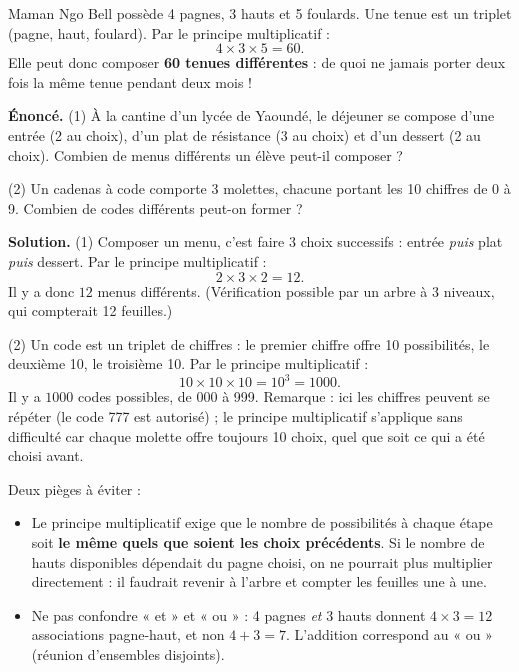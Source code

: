 \documentclass[11pt]{article}
\begin{document}
\begin{exemplebox}
Maman Ngo Bell possède 4 pagnes, 3 hauts et 5 foulards. Une tenue est un triplet (pagne, haut, foulard). Par le principe multiplicatif :
\[ 4\times 3\times 5=60. \]
Elle peut donc composer \textbf{60 tenues différentes} : de quoi ne jamais porter deux fois la même tenue pendant deux mois !
\end{exemplebox}

\begin{exoresolu}
\textbf{Énoncé.} (1) À la cantine d'un lycée de Yaoundé, le déjeuner se compose d'une entrée (2 au choix), d'un plat de résistance (3 au choix) et d'un dessert (2 au choix). Combien de menus différents un élève peut-il composer ?

(2) Un cadenas à code comporte 3 molettes, chacune portant les 10 chiffres de 0 à 9. Combien de codes différents peut-on former ?

\tcblower
\textbf{Solution.} (1) Composer un menu, c'est faire 3 choix successifs : entrée \emph{puis} plat \emph{puis} dessert. Par le principe multiplicatif :
\[ 2\times 3\times 2=12. \]
Il y a donc $\boxed{12}$ menus différents. (Vérification possible par un arbre à 3 niveaux, qui compterait 12 feuilles.)

(2) Un code est un triplet de chiffres : le premier chiffre offre 10 possibilités, le deuxième 10, le troisième 10. Par le principe multiplicatif :
\[ 10\times 10\times 10=10^3=1000. \]
Il y a $\boxed{1000}$ codes possibles, de 000 à 999. Remarque : ici les chiffres peuvent se répéter (le code 777 est autorisé) ; le principe multiplicatif s'applique sans difficulté car chaque molette offre toujours 10 choix, quel que soit ce qui a été choisi avant.
\end{exoresolu}

\begin{attention}
Deux pièges à éviter :
\begin{itemize}
\item Le principe multiplicatif exige que le nombre de possibilités à chaque étape soit \textbf{le même quels que soient les choix précédents}. Si le nombre de hauts disponibles dépendait du pagne choisi, on ne pourrait plus multiplier directement : il faudrait revenir à l'arbre et compter les feuilles une à une.
\item Ne pas confondre « et » et « ou » : 4 pagnes \emph{et} 3 hauts donnent $4\times 3=12$ associations pagne-haut, et non $4+3=7$. L'addition correspond au « ou » (réunion d'ensembles disjoints).
\end{itemize}
\end{attention}
\end{document}
